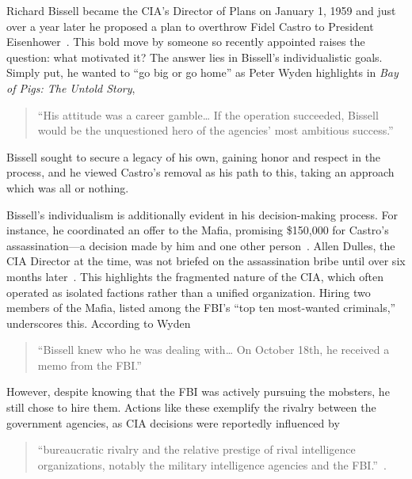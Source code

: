 \documentclass[12pt]{article}
\begin{document}
    Richard Bissell became the CIA's Director of Plans on January 1, 1959 and just over a year later he proposed a plan to overthrow Fidel Castro to President Eisenhower~\parencite{Wyden1979}. This bold move by someone so recently appointed raises the question: what motivated it? The answer lies in Bissell's individualistic goals. Simply put, he wanted to “go big or go home” as Peter Wyden highlights in \textit{Bay of Pigs: The Untold Story}, 

    \begin{quotation}
        “His attitude was a career gamble… If the operation succeeded, Bissell would be the unquestioned hero of the agencies' most ambitious success.”
    \end{quotation} 

    Bissell sought to secure a legacy of his own, gaining honor and respect in the process, and he viewed Castro's removal as his path to this, taking an approach which was all or nothing.

    Bissell's individualism is additionally evident in his decision-making process. For instance, he coordinated an offer to the Mafia, promising \$150,000 for Castro's assassination—a decision made by him and one other person~\parencite{Wyden1979}. Allen Dulles, the CIA Director at the time, was not briefed on the assassination bribe until over six months later~\parencite{Wyden1979}. This highlights the fragmented nature of the CIA, which often operated as isolated factions rather than a unified organization. Hiring two members of the Mafia, listed among the FBI's “top ten most-wanted criminals,” underscores this. According to Wyden 

    \begin{quotation}
        “Bissell knew who he was dealing with… On October 18th, he received a memo from the FBI.”~\parencite{Wyden1979}
    \end{quotation}  

    However, despite knowing that the FBI was actively pursuing the mobsters, he still chose to hire them. Actions like these exemplify the rivalry between the government agencies, as CIA decisions were reportedly influenced by 

    \begin{quotation} 
        “bureaucratic rivalry and the relative prestige of rival intelligence organizations, notably the military intelligence agencies and the FBI.”~\parencite{JeffreysJones2003}.
    \end{quotation} 
    
\end{document}
